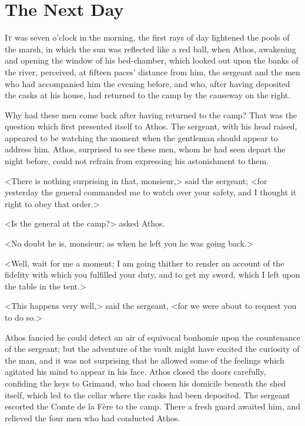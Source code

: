 \chapter{The Next Day}

\lettrine{I}{t} was seven o'clock in the morning, the first rays of day lightened the pools of the marsh, in which the sun was reflected like a red ball, when Athos, awakening and opening the window of his bed-chamber, which looked out upon the banks of the river, perceived, at fifteen paces' distance from him, the sergeant and the men who had accompanied him the evening before, and who, after having deposited the casks at his house, had returned to the camp by the causeway on the right.

Why had these men come back after having returned to the camp? That was the question which first presented itself to Athos. The sergeant, with his head raised, appeared to be watching the moment when the gentleman should appear to address him. Athos, surprised to see these men, whom he had seen depart the night before, could not refrain from expressing his astonishment to them.

<There is nothing surprising in that, monsieur,> said the sergeant; <for yesterday the general commanded me to watch over your safety, and I thought it right to obey that order.>

<Is the general at the camp?> asked Athos.

<No doubt he is, monsieur; as when he left you he was going back.>

<Well, wait for me a moment; I am going thither to render an account of the fidelity with which you fulfilled your duty, and to get my sword, which I left upon the table in the tent.>

<This happens very well,> said the sergeant, <for we were about to request you to do so.>

Athos fancied he could detect an air of equivocal bonhomie upon the countenance of the sergeant; but the adventure of the vault might have excited the curiosity of the man, and it was not surprising that he allowed some of the feelings which agitated his mind to appear in his face. Athos closed the doors carefully, confiding the keys to Grimaud, who had chosen his domicile beneath the shed itself, which led to the cellar where the casks had been deposited. The sergeant escorted the Comte de la Fère to the camp. There a fresh guard awaited him, and relieved the four men who had conducted Athos.


